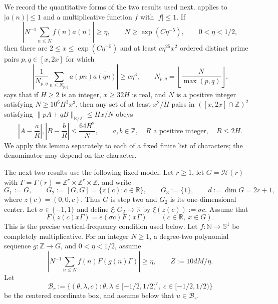 \documentclass[twoside]{aomart}
\theoremstyle{paperplain}
\theoremstyle{paperdefinition}
\numberwithin{equation}{section}
\begin{document}
We record the quantitative forms of the two results used next.
 applies to $|a(n)|\le1$ and
a multiplicative function $f$ with $|f|\le1$. If
\begin{equation*}
 \left|N^{-1}\sum_{n\le N}f(n)a(n)\right|\ge\eta,
 \qquad N\ge\exp(C\eta^{-5}),\qquad 0<\eta<1/2,
\end{equation*}
then there are $2\le x\le\exp(C\eta^{-5})$
and at least $c\eta^{25}x^2$ ordered distinct prime pairs
$p,q\in[x,2x]$ for which
\begin{equation}
 \left|\frac1{N_{p,q}}\sum_{n\le N_{p,q}}
             a(pn)\overline{a(qn)}\right|\ge c\eta^3,
 \qquad N_{p,q}=\left\lfloor\frac N{\max(p,q)}\right\rfloor.
 \label{inv:dense-interface}
\end{equation}
 says that if $H\ge2$ is an integer,
$x\ge32H$ is real, and $N$ is a positive integer satisfying
$N\ge10^6H^3x^3$, then any set of at least $x^2/H$ pairs in
$([x,2x]\cap\mathbb Z)^2$ satisfying
$\|pA+qB\|_{\mathbb R/\mathbb Z}\le Hx/N$ obeys
\begin{equation}
 \left|A-\frac aR\right|,
 \left|B-\frac bR\right|\le\frac{64H^2}{N},
 \qquad a,b\in\mathbb Z,\quad R\text{ a positive integer},\quad R\le2H.
 \label{inv:dense-linear-interface}
\end{equation}
We apply this lemma separately to each of a fixed finite list
of characters; the denominator may depend on the character.

The next two results use the following fixed model. Let $r\ge1$,
let $G=\mathcal H(r)$ with
$\Gamma=\Gamma(r)=\mathbb Z^r\times\mathbb Z^r\times\mathbb Z$, and
write
\[
 G_1:=G,\qquad G_2:=[G,G]=\{z(c):c\in\mathbb R\},\qquad
 G_3:=\{1\},\qquad d:=\dim G=2r+1,
\]
where $z(c)=(0,0,c)$. Thus $G$ is step two and $G_2$ is its one-dimensional
center. Let $\sigma\in\{-1,1\}$ and define
$\xi:G_2\to\mathbb R$ by $\xi(z(c)):=\sigma c$. Assume that
\[
 F(z(c)x\Gamma)=e(\sigma c)F(x\Gamma)
 \qquad(c\in\mathbb R,\ x\in G).
\]
This is the precise vertical-frequency condition used below. Let
$f:\mathbb N\to\mathbb S^1$ be completely multiplicative. For an integer
$N\ge1$, a degree-two polynomial sequence $g:\mathbb Z\to G$, and
$0<\eta<1/2$, assume
\begin{equation}
 \left|N^{-1}\sum_{n\le N}f(n)F(g(n)\Gamma)\right|\ge\eta,
 \qquad Z:=10dM/\eta .
\label{inv:eq:Heisenberg-input}
\end{equation}
Let
\[
 \mathcal B_r:=\{(\theta,\lambda,c):
   \theta,\lambda\in[-1/2,1/2)^r,\ c\in[-1/2,1/2)\}
\]
be the centered coordinate box, and assume below that $u\in\mathcal B_r$.
\end{document}
